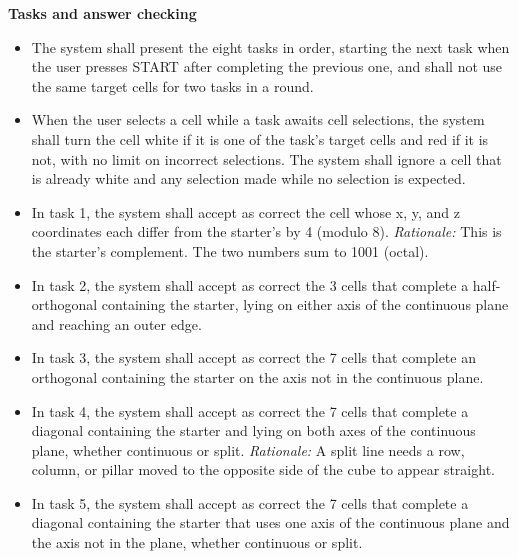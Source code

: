 \documentclass[12pt]{article}
\newcounter{reqnum} %
\begin{document}
\noindent \textbf{Tasks and answer checking}
\begin{itemize}
 
\item[FR\refstepcounter{reqnum}\thereqnum \label{FR_TaskOrder}:] The system shall present the eight tasks in order, starting the next task when the user presses START after completing the previous one, and shall not use the same target cells for two tasks in a round.
 
\item[FR\refstepcounter{reqnum}\thereqnum \label{FR_CellFeedback}:] When the user selects a cell while a task awaits cell selections, the system shall turn the cell white if it is one of the task's target cells and red if it is not, with no limit on incorrect selections. The system shall ignore a cell that is already white and any selection made while no selection is expected.
 
\item[FR\refstepcounter{reqnum}\thereqnum \label{FR_Task1}:] In task 1, the system shall accept as correct the cell whose x, y, and z coordinates each differ from the starter's by 4 (modulo 8). \newline \textit{Rationale:} This is the starter's complement. The two numbers sum to 1001 (octal).
 
\item[FR\refstepcounter{reqnum}\thereqnum \label{FR_Task2}:] In task 2, the system shall accept as correct the 3 cells that complete a half-orthogonal containing the starter, lying on either axis of the continuous plane and reaching an outer edge.
 
\item[FR\refstepcounter{reqnum}\thereqnum \label{FR_Task3}:] In task 3, the system shall accept as correct the 7 cells that complete an orthogonal containing the starter on the axis not in the continuous plane.
 
\item[FR\refstepcounter{reqnum}\thereqnum \label{FR_Task4}:] In task 4, the system shall accept as correct the 7 cells that complete a diagonal containing the starter and lying on both axes of the continuous plane, whether continuous or split. \newline \textit{Rationale:} A split line needs a row, column, or pillar moved to the opposite side of the cube to appear straight.
 
\item[FR\refstepcounter{reqnum}\thereqnum \label{FR_Task5}:] In task 5, the system shall accept as correct the 7 cells that complete a diagonal containing the starter that uses one axis of the continuous plane and the axis not in the plane, whether continuous or split.
 

\end{itemize}
\end{document}
